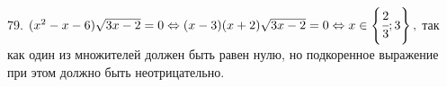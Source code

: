 79. $(x^2-x-6)\sqrt{3x-2}=0\Leftrightarrow (x-3)(x+2)\sqrt{3x-2}=0\Leftrightarrow x\in\left\{\cfrac{2}{3};3\right\},$ так как один из множителей должен быть равен нулю, но подкоренное выражение при этом должно быть неотрицательно.\\
